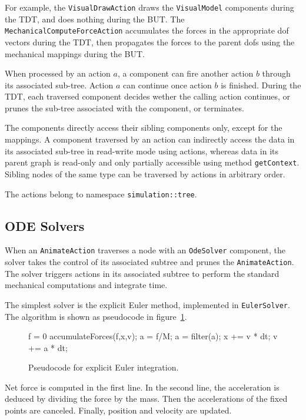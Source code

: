 For example, the \texttt{VisualDrawAction} draws the \texttt{VisualModel} components during the TDT, and does nothing during the BUT.
The \texttt{MechanicalComputeForceAction} accumulates the forces in the appropriate dof vectors during the TDT, then propagates the forces to the parent dofs using the mechanical mappings during the BUT.

When processed by an action $a$, a component can fire another action $b$ through its associated sub-tree. Action $a$ can continue once action $b$ is finished.
During the TDT, each traversed component decides wether the calling action continues, or prunes the sub-tree associated with the component, or terminates.

The components directly access their sibling components only, except for the mappings.
A component traversed by an action can indirectly access the data in its associated sub-tree in read-write mode using actions, whereas data in its parent graph is read-only and only partially accessible using method \texttt{getContext}.
Sibling nodes of the same type can be traversed by actions in arbitrary order.

The actions belong to namespace \texttt{simulation::tree}.

\subsection{ODE Solvers}
When an \texttt{AnimateAction} traverses a node with an \texttt{OdeSolver} component, 
the solver takes the control of its associated subtree and prunes the \texttt{AnimateAction}. The solver triggers actions in its associated subtree to perform the standard mechanical computations and integrate time.

The simplest solver is the explicit Euler method, implemented in \texttt{EulerSolver}. The algorithm is shown as pseudocode in figure~\ref{pc:expliciteuler}.
\begin{figure}
\begin{code_cpp}
f = 0
accumulateForces(f,x,v);
a = f/M;
a = filter(a);
x += v * dt;
v += a * dt;
\end{code_cpp}
\caption{Pseudocode for explicit Euler integration.}
\label{pc:expliciteuler}
\end{figure}
Net force is computed in the first line. 
In the second line, the acceleration is deduced by dividing the force by the mass.
Then the accelerations of the fixed points are canceled.
Finally, position and velocity are updated.

